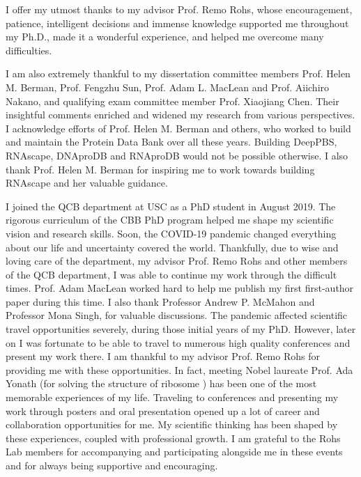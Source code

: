 
I offer my utmost thanks to my advisor Prof. Remo Rohs, whose encouragement, patience, intelligent decisions and immense knowledge supported me throughout my Ph.D., made it a wonderful experience, and helped me overcome many difficulties.

I am also extremely thankful to my dissertation committee members Prof. Helen M. Berman, Prof. Fengzhu Sun, Prof. Adam L. MacLean and Prof. Aiichiro Nakano, and qualifying exam committee member Prof. Xiaojiang Chen. Their insightful comments enriched and widened my research from various perspectives. I acknowledge efforts of Prof. Helen M. Berman and others, who worked to build and maintain the Protein Data Bank over all these years. Building DeepPBS, RNAscape, DNAproDB and RNAproDB would not be possible otherwise. I also thank Prof. Helen M. Berman for inspiring me to work towards building RNAscape and her valuable guidance.

I joined the QCB department at USC as a PhD student in August 2019. The rigorous curriculum of the CBB PhD program helped me shape my scientific vision and research skills. Soon, the COVID-19 pandemic changed everything about our life and uncertainty covered the world. Thankfully, due to wise and loving care of the department, my advisor Prof. Remo Rohs and other members of the QCB department, I was able to continue my work through the difficult times. Prof. Adam MacLean worked hard to help me publish my first first-author paper during this time. I also thank Professor Andrew P. McMahon and Professor Mona Singh, for valuable discussions. The pandemic affected scientific travel opportunities severely, during those initial years of my PhD. However, later on I was fortunate to be able to travel to numerous high quality conferences and present my work there. I am thankful to my advisor Prof. Remo Rohs for providing me with these opportunities. In fact, meeting Nobel laureate Prof. Ada Yonath (for solving the structure of ribosome \citep{schluenzen2000structure, harms2001high}) has been one of the most memorable experiences of my life. Traveling to conferences and presenting my work through posters and oral presentation opened up a lot of career and collaboration opportunities for me. My scientific thinking has been shaped by these experiences, coupled with professional growth. I am grateful to the Rohs Lab members for accompanying and participating alongside me in these events and for always being supportive and encouraging. 

